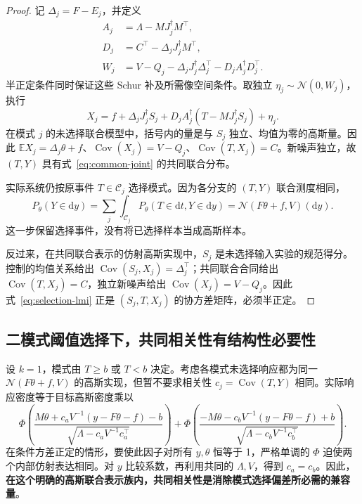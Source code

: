 \documentclass[UTF8,fontset=fandol,11pt,a4paper]{ctexart}
\newcommand{\N}{\mathcal N}
\newcommand{\E}{\mathbb E}
\newcommand{\Cov}{\operatorname{Cov}}
\newcommand{\dd}{\mathrm d}
\theoremstyle{definition}
\theoremstyle{remark}
\numberwithin{equation}{section}
\begin{document}
\begin{proof}
记 $\Delta_j=F-E_j$，并定义
\begin{align}
 A_j&=\Lambda-MJ_j^\dagger M^\top,\\
 D_j&=C^\top-\Delta_jJ_j^\dagger M^\top,\\
 W_j&=V-Q_j-\Delta_jJ_j^\dagger\Delta_j^\top-D_jA_j^\dagger D_j^\top.
 \label{eq:sel-control-slack}
\end{align}
半正定条件同时保证这些 Schur 补及所需像空间条件。取独立 $\eta_j\sim\N(0,W_j)$，执行
\begin{equation}
 \boxed{X_j=f+\Delta_jJ_j^\dagger S_j
       +D_jA_j^\dagger(T-MJ_j^\dagger S_j)+\eta_j.}
 \label{eq:sel-control}
\end{equation}
在模式 $j$ 的未选择联合模型中，括号内的量是与 $S_j$ 独立、均值为零的高斯量。因此 $\E X_j=\Delta_j\theta+f$、$\Cov(X_j)=V-Q_j$、$\Cov(T,X_j)=C$。新噪声独立，故 $(T,Y)$ 具有式~\eqref{eq:common-joint} 的共同联合分布。

实际系统仍按原事件 $T\in\mathcal C_j$ 选择模式。因为各分支的 $(T,Y)$ 联合测度相同，
\[
 P_\theta(Y\in\dd y)=\sum_j\int_{\mathcal C_j}P_\theta(T\in\dd t,Y\in\dd y)
 =\N(F\theta+f,V)(\dd y).
\]
这一步保留选择事件，没有将已选择样本当成高斯样本。

反过来，在共同联合表示的仿射高斯实现中，$S_j$ 是未选择输入实验的规范得分。控制的均值关系给出 $\Cov(S_j,X_j)=\Delta_j^\top$；共同联合合同给出 $\Cov(T,X_j)=C$，独立新噪声给出 $\Cov(X_j)=V-Q_j$。因此式~\eqref{eq:selection-lmi} 正是 $(S_j,T,X_j)$ 的协方差矩阵，必须半正定。
\end{proof}

\subsection{二模式阈值选择下，共同相关性有结构性必要性}
设 $k=1$，模式由 $T\ge b$ 或 $T<b$ 决定。考虑各模式未选择响应都为同一 $\N(F\theta+f,V)$ 的高斯实现，但暂不要求相关性 $c_j=\Cov(T,Y)$ 相同。实际响应密度等于目标高斯密度乘以
\begin{equation}
 \Phi\!\left(\frac{M\theta+c_aV^{-1}(y-F\theta-f)-b}
 {\sqrt{\Lambda-c_aV^{-1}c_a^\top}}\right)
 +\Phi\!\left(\frac{-M\theta-c_bV^{-1}(y-F\theta-f)+b}
 {\sqrt{\Lambda-c_bV^{-1}c_b^\top}}\right).
 \label{eq:probit-cancellation}
\end{equation}
在条件方差正定的情形，要使此因子对所有 $y,\theta$ 恒等于 1，严格单调的 $\Phi$ 迫使两个内部仿射表达相同。对 $y$ 比较系数，再利用共同的 $\Lambda,V$，得到 $c_a=c_b$。因此，\textbf{在这个明确的高斯联合表示族内，共同相关性是消除模式选择偏差所必需的兼容量}。
\end{document}
